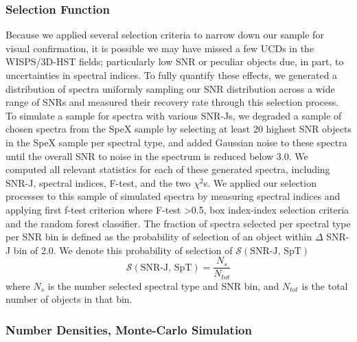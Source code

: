 \documentclass[manuscript]{aastex}
\begin{document}
\subsubsection{Selection Function}\label{selectionf}
Because we applied several selection criteria to narrow down our sample for visual confirmation, it is possible we may have missed a few UCDs in the WISPS/3D-HST fields; particularly low SNR or peculiar objects due, in part, to uncertainties in spectral indices. To fully quantify these effects, we generated a distribution of spectra uniformly sampling our SNR distribution across a wide range of SNRs and measured their recovery rate through this selection process. To simulate a sample for spectra with various SNR-Js, we degraded a sample of chosen spectra from the SpeX sample by selecting at least 20 highest SNR objects in the SpeX sample per spectral type, and added Gaussian noise to these spectra until the overall SNR to noise in the spectrum is reduced below 3.0. We computed all relevant statistics for each of these generated spectra, including SNR-J, spectral indices, F-test, and the two $\chi^2$s. We applied our selection processes to this sample of simulated spectra by measuring spectral indices and applying first f-test criterion where F-test \textgreater0.5, box index-index selection criteria and the random forest classifier. The fraction of spectra selected per spectral type per SNR bin is defined as the probability of selection of an object within $\Delta$ SNR-J bin of 2.0. We denote this probability of selection of $\mathcal{S}(\text{SNR-J, SpT})$
\begin{equation*}
\mathcal{S}(\text{SNR-J, SpT})= \frac{N_s}{N_{tot}}
\end{equation*} where $N_s$ is the number selected spectral type and SNR bin, and $N_{tot}$ is the total number of objects in that bin.

\subsubsection{Number Densities, Monte-Carlo Simulation}
\end{document}
